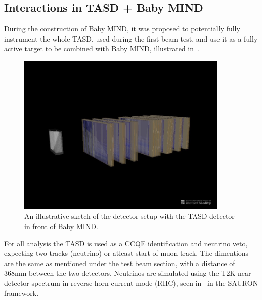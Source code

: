 

\pagebreak
\subsection{Interactions in TASD + Baby MIND}

During the construction of Baby MIND, it was proposed to potentially fully instrument the whole TASD, used during the first beam test, and use it as a fully active target to be combined with Baby MIND, illustrated in~.

\begin{figure}[h!]
\centering
\includegraphics[width=0.9\textwidth]{figures/MINDAida.jpeg}
\caption{An illustrative sketch of the detector setup with the TASD detector in front of Baby MIND.}
\label{fig:TASDandMIND}
\end{figure}

For all analysis the TASD is used as a CCQE identification and neutrino veto, expecting two tracks (neutrino) or atleast start of muon track. The dimentions are the same as mentioned under the test beam section, with a distance of 368mm between the two detectors. Neutrinos are simulated using the T2K near detector spectrum in reverse horn current mode (RHC), seen in~ in the SAURON framework. 




